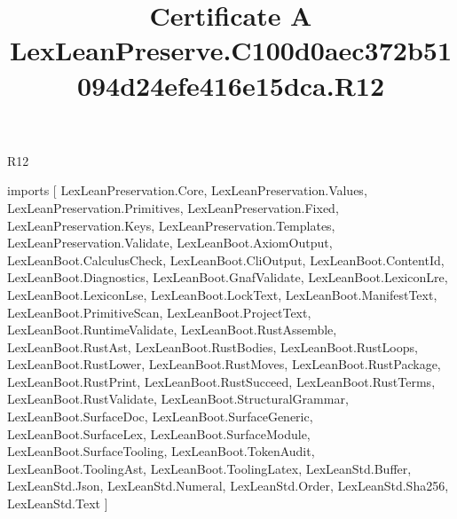 \begin{lexlean}{R12}
\title{Certificate A LexLeanPreserve.C100d0aec372b51094d24efe416e15dca.R12}
\begin{coremodule}
imports [
  LexLeanPreservation.Core,
  LexLeanPreservation.Values,
  LexLeanPreservation.Primitives,
  LexLeanPreservation.Fixed,
  LexLeanPreservation.Keys,
  LexLeanPreservation.Templates,
  LexLeanPreservation.Validate,
  LexLeanBoot.AxiomOutput,
  LexLeanBoot.CalculusCheck,
  LexLeanBoot.CliOutput,
  LexLeanBoot.ContentId,
  LexLeanBoot.Diagnostics,
  LexLeanBoot.GnafValidate,
  LexLeanBoot.LexiconLre,
  LexLeanBoot.LexiconLse,
  LexLeanBoot.LockText,
  LexLeanBoot.ManifestText,
  LexLeanBoot.PrimitiveScan,
  LexLeanBoot.ProjectText,
  LexLeanBoot.RuntimeValidate,
  LexLeanBoot.RustAssemble,
  LexLeanBoot.RustAst,
  LexLeanBoot.RustBodies,
  LexLeanBoot.RustLoops,
  LexLeanBoot.RustLower,
  LexLeanBoot.RustMoves,
  LexLeanBoot.RustPackage,
  LexLeanBoot.RustPrint,
  LexLeanBoot.RustSucceed,
  LexLeanBoot.RustTerms,
  LexLeanBoot.RustValidate,
  LexLeanBoot.StructuralGrammar,
  LexLeanBoot.SurfaceDoc,
  LexLeanBoot.SurfaceGeneric,
  LexLeanBoot.SurfaceLex,
  LexLeanBoot.SurfaceModule,
  LexLeanBoot.SurfaceTooling,
  LexLeanBoot.TokenAudit,
  LexLeanBoot.ToolingAst,
  LexLeanBoot.ToolingLatex,
  LexLeanStd.Buffer,
  LexLeanStd.Json,
  LexLeanStd.Numeral,
  LexLeanStd.Order,
  LexLeanStd.Sha256,
  LexLeanStd.Text
]


\end{coremodule}
\end{lexlean}
